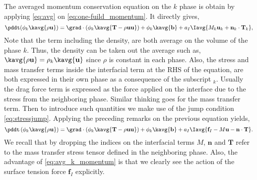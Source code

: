 The averaged momentum conservation equation on the $k$ phase is obtain by applying 
\ref{eq:avg} on \ref{eq:one-fuild_momentum}. 
It directly gives, 
\begin{equation}
    \pddt (\phi_k\kavg{\rho\textbf{u}}) 
    = \grad\cdot\left(
        \phi_k \kavg{\textbf{T}
        - \rho\textbf{uu}}
    \right)
    +\phi_k\kavg{\textbf{b}}
    + a_I\Iavg{M_k \textbf{u}_k +\textbf{n}_k\cdot\textbf{T}_k},
\end{equation}
Note that the term including the density, are both average on the volume of the phase $k$.
Thus, the density can be taken out the average such as, $\kavg{\rho \textbf{u}} = \rho_k\kavg{\textbf{u}}$ since $\rho$ is constant in each phase. 
Also, the stress and mass transfer terms inside the interfacial term at the RHS of the equation, are both expressed in their own phase as a consequence of the subscript $_k$.
Usually the drag force term is expressed as the force applied on the interface due to the stress from the neighboring phase. 
Similar thinking goes for the mass transfer term. 
Then to introduce such quantities we make use of the jump condition \ref{eq:stressjump}. 
Applying the preceding remarks on the previous equation yields,
\begin{equation}
    \pddt \left(
        \phi_k\kavg{\rho\textbf{u}}
    \right)
    = \grad\cdot\left(
        \phi_k \kavg{
            \textbf{T}
            -\rho \textbf{uu}}
    \right)
    +\phi_k\kavg{\textbf{b}}
    + a_I\Iavg{
        \textbf{f}_I 
        - M \textbf{u} 
        - \textbf{n}\cdot\textbf{T}
    }.
    \label{eq:avg_k_momentum}
\end{equation}
We recall that by dropping the indices on the interfacial terms $M$, $\textbf{n}$ and $\textbf{T}$ refer to the mass transfer stress tensor defined in the neighboring phase. 
Also, the advantage of \ref{eq:avg_k_momentum} is that we clearly see the action of the surface tension force $\textbf{f}_I$ explicitly.

